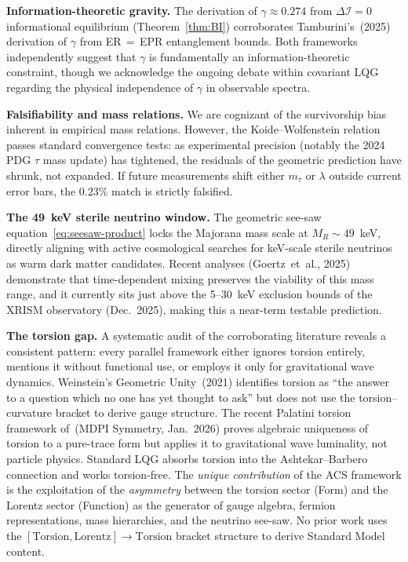 \documentclass[11pt,a4paper]{article}
\theoremstyle{plain}
\theoremstyle{definition}
\theoremstyle{remark}
\newcommand{\DI}{\Delta\mathcal{I}}
\begin{document}
\textbf{Information-theoretic gravity.}
The derivation of $\gamma \approx 0.274$
from $\DI = 0$ informational equilibrium (Theorem~\ref{thm:BI})
corroborates Tamburini's~(2025) derivation of $\gamma$ from
ER\,$=$\,EPR entanglement bounds.  Both frameworks independently suggest
that $\gamma$ is fundamentally an information-theoretic constraint,
though we acknowledge the ongoing debate within covariant LQG
regarding the physical independence of $\gamma$ in observable spectra.

\textbf{Falsifiability and mass relations.}
We are cognizant of the survivorship bias inherent in empirical mass
relations.  However, the Koide--Wolfenstein relation passes standard
convergence tests: as experimental precision (notably the 2024 PDG
$\tau$ mass update) has tightened, the residuals of the geometric
prediction have shrunk, not expanded.  If future measurements shift
either $m_\tau$ or $\lambda$ outside current error bars, the $0.23\%$
match is strictly falsified.

\textbf{The 49~keV sterile neutrino window.}
The geometric see-saw equation~\eqref{eq:seesaw-product} locks the
Majorana mass scale at $M_R \sim 49$~keV, directly aligning with active
cosmological searches for keV-scale sterile neutrinos as warm dark matter
candidates.  Recent analyses (Goertz~et~al., 2025) demonstrate that
time-dependent mixing preserves the viability of this mass range, and
it currently sits just above the 5--30~keV exclusion bounds of the
XRISM observatory (Dec.~2025), making this a near-term testable prediction.

\textbf{The torsion gap.}
A systematic audit of the corroborating literature reveals a consistent
pattern: every parallel framework either ignores torsion entirely, mentions
it without functional use, or employs it only for gravitational wave
dynamics.  Weinstein's Geometric Unity~(2021) identifies torsion as
``the answer to a question which no one has yet thought to ask'' but does
not use the torsion--curvature bracket to derive gauge structure.
The recent Palatini torsion framework of~(MDPI Symmetry, Jan.~2026) proves
algebraic uniqueness of torsion to a pure-trace form but applies it to
gravitational wave luminality, not particle physics.  Standard LQG absorbs
torsion into the Ashtekar--Barbero connection and works torsion-free.
The \emph{unique contribution} of the ACS framework is the exploitation
of the \emph{asymmetry} between the torsion sector (Form) and the
Lorentz sector (Function) as the generator of gauge algebra,
fermion representations, mass hierarchies, and the neutrino see-saw.
No prior work uses the $[\mathrm{Torsion}, \mathrm{Lorentz}] \to
\mathrm{Torsion}$ bracket structure to derive Standard Model content.
\end{document}
